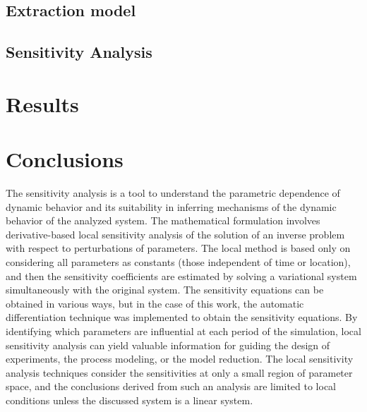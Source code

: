 \documentclass[a4paper,fleqn]{cas-dc}
\begin{document}
\subsection{Extraction model} \label{CH: Extraction_model}


%

\subsection{Sensitivity Analysis} \label{CH: Sensitivity_Analysis}


%

\section{Results}


\section{Conclusions} \label{CH: Conclusion}

The sensitivity analysis is a tool to understand the parametric dependence of dynamic behavior and its suitability in inferring mechanisms of the dynamic behavior of the analyzed system. The mathematical formulation involves derivative-based local sensitivity analysis of the solution of an inverse problem with respect to perturbations of parameters. The local method is based only on considering all parameters as constants (those independent of time or location), and then the sensitivity coefficients are estimated by solving a variational system simultaneously with the original system. The sensitivity equations can be obtained in various ways, but in the case of this work, the automatic differentiation technique was implemented to obtain the sensitivity equations. By identifying which parameters are influential at each period of the simulation, local sensitivity analysis can yield valuable information for guiding the design of experiments, the process modeling, or the model reduction. The local sensitivity analysis techniques consider the sensitivities at only a small region of parameter space, and the conclusions derived from such an analysis are limited to local conditions unless the discussed system is a linear system.
\end{document}

